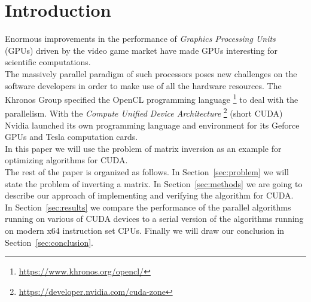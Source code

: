 


\section{Introduction}\label{sec:introduction}
Enormous improvements in the performance of \emph{Graphics Processing Units} (GPUs) driven by the video game market have made GPUs interesting for scientific computations. \\
The massively parallel paradigm of such processors poses new challenges on the software developers in order to make use of all the hardware resources. The Khronos Group specified the OpenCL programming language \footnote{\url{https://www.khronos.org/opencl/}} to deal with the parallelism. With the \emph{Compute Unified Device Architecture} \footnote{\url{https://developer.nvidia.com/cuda-zone}} (short CUDA) Nvidia launched its own programming language and environment for its Geforce GPUs and Tesla computation cards. \\
In this paper we will use the problem of matrix inversion as an example  for optimizing algorithms for CUDA.
\vspace{0.3cm}\\
The rest of the paper is organized as follows.  In Section~\ref{sec:problem} we will state the problem of inverting a matrix. In Section~\ref{sec:methods} we are going to describe our approach of implementing and verifying the algorithm for CUDA.\\
In Section~\ref{sec:results} we compare the performance of the parallel algorithms running on various of CUDA devices to a serial version of the algorithms running on modern x64 instruction set CPUs. Finally we will draw our conclusion in Section~\ref{sec:conclusion}.




